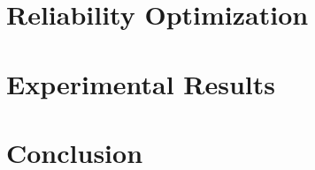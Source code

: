 \documentclass[conference]{IEEEtran}
\begin{document}
  \section{Reliability Optimization}

  \section{Experimental Results} 

  \section{Conclusion} 
  

  
  

  \appendix
  
\end{document}

